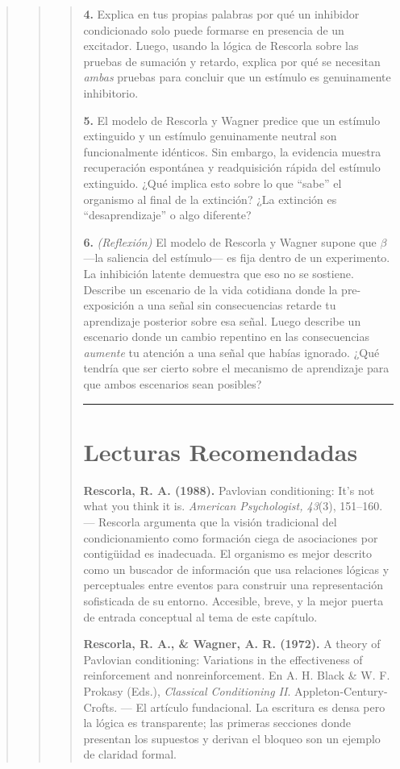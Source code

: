 \documentclass[
  letterpaper,
  DIV=11,
  numbers=noendperiod]{scrreprt}
\begin{document}
\begin{tcolorbox}[enhanced jigsaw, toprule=.15mm, arc=.35mm, colback=white, opacityback=0, colframe=quarto-callout-note-color-frame, breakable, rightrule=.15mm, left=2mm, leftrule=.75mm, bottomrule=.15mm]
\begin{quote}
\begin{quote}
\begin{quote}
\textbf{4.} Explica en tus propias palabras por qué un inhibidor
condicionado solo puede formarse en presencia de un excitador. Luego,
usando la lógica de Rescorla sobre las pruebas de sumación y retardo,
explica por qué se necesitan \emph{ambas} pruebas para concluir que un
estímulo es genuinamente inhibitorio.

\textbf{5.} El modelo de Rescorla y Wagner predice que un estímulo
extinguido y un estímulo genuinamente neutral son funcionalmente
idénticos. Sin embargo, la evidencia muestra recuperación espontánea y
readquisición rápida del estímulo extinguido. ¿Qué implica esto sobre lo
que ``sabe'' el organismo al final de la extinción? ¿La extinción es
``desaprendizaje'' o algo diferente?

\textbf{6.} \emph{(Reflexión)} El modelo de Rescorla y Wagner supone que
\(\beta\) ---la saliencia del estímulo--- es fija dentro de un
experimento. La inhibición latente demuestra que eso no se sostiene.
Describe un escenario de la vida cotidiana donde la pre-exposición a una
señal sin consecuencias retarde tu aprendizaje posterior sobre esa
señal. Luego describe un escenario donde un cambio repentino en las
consecuencias \emph{aumente} tu atención a una señal que habías
ignorado. ¿Qué tendría que ser cierto sobre el mecanismo de aprendizaje
para que ambos escenarios sean posibles?

\begin{center}\rule{0.5\linewidth}{0.5pt}\end{center}

\section{Lecturas Recomendadas}\label{lecturas-recomendadas-3}

\textbf{Rescorla, R. A. (1988).} Pavlovian conditioning: It's not what
you think it is. \emph{American Psychologist, 43}(3), 151--160. ---
Rescorla argumenta que la visión tradicional del condicionamiento como
formación ciega de asociaciones por contigüidad es inadecuada. El
organismo es mejor descrito como un buscador de información que usa
relaciones lógicas y perceptuales entre eventos para construir una
representación sofisticada de su entorno. Accesible, breve, y la mejor
puerta de entrada conceptual al tema de este capítulo.

\textbf{Rescorla, R. A., \& Wagner, A. R. (1972).} A theory of Pavlovian
conditioning: Variations in the effectiveness of reinforcement and
nonreinforcement. En A. H. Black \& W. F. Prokasy (Eds.),
\emph{Classical Conditioning II}. Appleton-Century-Crofts. --- El
artículo fundacional. La escritura es densa pero la lógica es
transparente; las primeras secciones donde presentan los supuestos y
derivan el bloqueo son un ejemplo de claridad formal.


\end{quote}
\end{quote}
\end{quote}
\end{tcolorbox}
\end{document}
